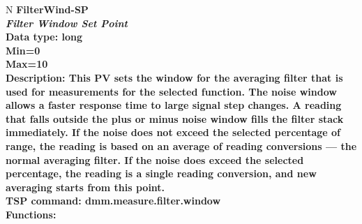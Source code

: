 \documentclass[openany]{article}
\begin{document}
		\begin{tabular}{N}
			\hline
			\bfseries FilterWind-SP\label{pv:filterwind-sp} \\ \hline
			\emph{Filter Window Set Point} \\
			Data type: long \\
			Min=0 \\
			Max=10 \\
			Description: This PV sets the window for the averaging filter that is used for measurements for the selected function. The noise window allows a faster response time to large signal step changes. A reading that falls outside the plus or minus noise window fills the filter stack immediately. If the noise does not exceed the selected percentage of range, the reading is based on an average of reading conversions — the normal averaging filter. If the noise does exceed the selected percentage, the reading is a single reading conversion, and new averaging starts from this point. \\
			TSP command: dmm.measure.filter.window \\
			Functions: \\
			\arrayrulecolor{\FuncTableBorderColor}

		\end{tabular}
\end{document}
